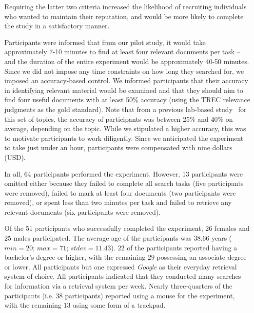 Requiring the latter two criteria increased the likelihood of recruiting individuals who wanted to maintain their reputation, and would be more likely to complete the study in a satisfactory manner. 

Participants were informed that from our pilot study, it would take approximately 7-10 minutes to find at least four relevant documents per task -- and the duration of the entire experiment would be approximately 40-50 minutes. Since we did not impose any time constraints on how long they searched for, we imposed an accuracy-based control. We informed participants that their accuracy in identifying relevant material would be examined and that they should aim to find four useful documents with at least 50\% accuracy (using the TREC relevance judgments as the gold standard). Note that from a previous lab-based study~\cite{maxwell2017snippet_length} for this set of topics, the accuracy of participants was between 25\% and 40\% on average, depending on the topic. While we stipulated a higher accuracy, this was to motivate participants to work diligently. Since we anticipated the experiment to take just under an hour, participants were compensated with nine dollars (USD).

In all, 64 participants performed the experiment. However, 13 participants were omitted either because they failed to complete all search tasks (five participants were removed), failed to mark at least four documents (two participants were removed), or spent less than two minutes per task and failed to retrieve any relevant documents (six participants were removed). 

Of the 51 participants who successfully completed the experiment, $26$ females and $25$ males participated. The average age of the participants was $38.66$ years ($min=20$; $max=71$; $stdev=11.43$). $22$ of the participants reported having a bachelor's degree or higher, with the remaining $29$ possessing an associate degree or lower. All participants but one expressed \emph{Google} as their everyday retrieval system of choice. All participants indicated that they conducted many searches for information via a retrieval system per week. Nearly three-quarters of the participants (i.e. 38 participants) reported using a mouse for the experiment, with the remaining $13$ using some form of a trackpad.

